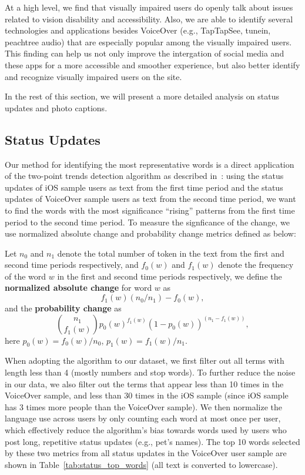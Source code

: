 \documentclass{sigchi}
\begin{document}
At a high level, we find that visually impaired users do openly talk about issues related to vision disability and accessibility. Also, we are able to identify several technologies and applications besides VoiceOver (e.g., TapTapSee, tunein, peachtree audio) that are especially popular among the visually impaired users. This finding can help us not only improve the intergation of social media and these apps for a more accessible and smoother experience, but also better identify and recognize visually impaired users on the site.  

In the rest of this section, we will present a more detailed analysis on status updates and photo captions.


\subsection{Status Updates}

Our method for identifying the most representative words is a direct application of the two-point trends detection algorithm as described in~\cite{kleinberg2004}: using the status updates of iOS sample users as text from the first time period and the status updates of VoiceOver sample users as text from the second time period, we want to find the words with the most significance ``rising'' patterns from the first time period to the second time period. To measure the signficance of the change, we use normalized absolute change and probability change metrics defined as below:
 
Let $n_0$ and $n_1$ denote the total number of token in the text from the first and second time periods respectively, and $f_0(w)$ and $f_1(w)$ denote the frequency of the word $w$ in the first and second time periods respectively, we define the \textbf{normalized absolute change} for word $w$ as 
\begin{equation}
f_1(w)(n_0/n_1)-f_0(w),
\end{equation}
 and the \textbf{probability change} as 
\begin{equation}
{n_1 \choose f_1(w)}p_0(w)^{f_1(w)}(1-p_0(w))^{(n_1-f_1(w))},
\end{equation}
here $p_0(w)=f_0(w)/n_0$, $p_1(w)=f_1(w)/n_1$.

When adopting the algorithm to our dataset, we first filter out all terms with length less than 4 (mostly numbers and stop words). To further reduce the noise in our data, we also filter out the terms that appear less than 10 times in the VoiceOver sample, and less than 30 times in the iOS sample (since iOS sample has 3 times more people than the VoiceOver sample). We then normalize the language use across users by only counting each word at most once per user, which effectively reduce the algorithm's bias towards words used by users who post long, repetitive status updates (e.g., pet's names). The top 10 words selected by these two metrics from all status updates in the VoiceOver user sample are shown in Table~\ref{tab:status_top_words} (all text is converted to lowercase).
\end{document}
